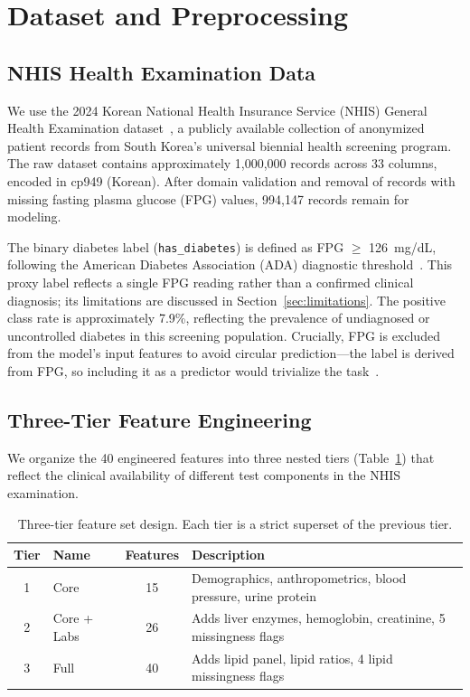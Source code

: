 \section{Dataset and Preprocessing}
\label{sec:dataset}

\subsection{NHIS Health Examination Data}
\label{sec:nhis}

We use the 2024 Korean National Health Insurance Service (NHIS) General Health Examination dataset~\cite{NHIS2025dataset}, a publicly available collection of anonymized patient records from South Korea's universal biennial health screening program. The raw dataset contains approximately 1,000,000 records across 33 columns, encoded in cp949 (Korean). After domain validation and removal of records with missing fasting plasma glucose (FPG) values, 994,147 records remain for modeling.

The binary diabetes label (\texttt{has\_diabetes}) is defined as FPG $\geq$ 126~mg/dL, following the American Diabetes Association (ADA) diagnostic threshold~\cite{ADA2024standards}. This proxy label reflects a single FPG reading rather than a confirmed clinical diagnosis; its limitations are discussed in Section~\ref{sec:limitations}. The positive class rate is approximately 7.9\%, reflecting the prevalence of undiagnosed or uncontrolled diabetes in this screening population. Crucially, FPG is excluded from the model's input features to avoid circular prediction---the label is derived from FPG, so including it as a predictor would trivialize the task~\cite{Han2020fpg}.

\subsection{Three-Tier Feature Engineering}
\label{sec:feature-tiers}

We organize the 40 engineered features into three nested tiers (Table~\ref{tab:feature-tiers}) that reflect the clinical availability of different test components in the NHIS examination.

\begin{table}[ht]
\centering
\caption{Three-tier feature set design. Each tier is a strict superset of the previous tier.}
\label{tab:feature-tiers}
\begin{tabular}{c l c p{3.8cm}}
\hline
\textbf{Tier} & \textbf{Name} & \textbf{Features} & \textbf{Description} \\
\hline
1 & Core & 15 & Demographics, anthropometrics, blood pressure, urine protein \\
2 & Core + Labs & 26 & Adds liver enzymes, hemoglobin, creatinine, 5 missingness flags \\
3 & Full & 40 & Adds lipid panel, lipid ratios, 4 lipid missingness flags \\
\hline
\end{tabular}
\end{table}

